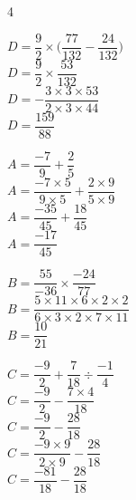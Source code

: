\documentclass[a4paper]{book}
\begin{document}
{\begin{exerciceNote}{4}
\begin{minipage}{0.24\linewidth}
            $D = \dfrac{9}{2}\times\bigg(\dfrac{77}{132}-\dfrac{24}{132}\bigg)$ \\[2ex]

            $D = \dfrac{9}{2}\times\dfrac{53}{132}$ \\[2ex]

            $D = -\dfrac{3\times3\times53}{2\times3\times44}$ \\[2ex]

            $D = \dfrac{159}{88}$
        \end{minipage} 

        \vspace{1cm}

        \begin{minipage}{0.24\linewidth}
            $A = \dfrac{-7}{9} + \dfrac{2}{5}$ \\[2ex]

            $A = \dfrac{-7\times5}{9\times5}+\dfrac{2\times9}{5\times9}$ \\[2ex]

            $A =\dfrac{-35}{45}+\dfrac{18}{45}$ \\[2ex]

            $A = \dfrac{-17}{45}$
        \end{minipage}
        \hfill\vline\hfill
        \begin{minipage}{0.24\linewidth}
            $B = \dfrac{55}{-36}\times\dfrac{-24}{77}$ \\[2ex]

            $B= \dfrac{5 \times 11 \times 6 \times 2  \times 2}{6 \times 3 \times 2 \times 7 \times 11}$ \\[2ex]

            $B=\dfrac{10}{21}$ 
        \end{minipage}        
        \hfill\vline\hfill
        \begin{minipage}{0.24\linewidth}
            $C = \dfrac{-9}{2}+\dfrac{7}{18}\div\dfrac{-1}{4}$ \\[2ex]

            $C = \dfrac{-9}{2}-\dfrac{7\times4}{18}$ \\[2ex]

            $C = \dfrac{-9}{2}-\dfrac{28}{18}$ \\[2ex]

            $C = \dfrac{-9\times9}{2\times9}-\dfrac{28}{18}$ \\[2ex]

            $C = \dfrac{-81}{18}-\dfrac{28}{18}$ \\[2ex]


\end{minipage}
\end{exerciceNote}}
\end{document}
